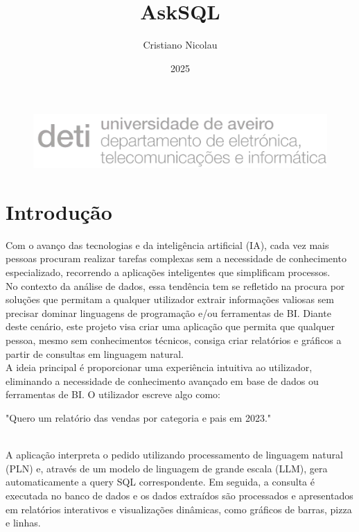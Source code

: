 \documentclass{article}
\title{AskSQL}
\author{Cristiano Nicolau}
\date{2025}
\begin{document}
\begin{figure}
    \centering
    \includegraphics[width=0.75\linewidth]{images/deti.png}
    \label{fig:enter-label}
\end{figure}
\maketitle


\clearpage


\tableofcontents
\clearpage

\section{Introdu\c{c}\~ao}


\hspace*{1em} Com o avanço das tecnologias e da inteligência artificial (IA), cada vez mais pessoas procuram realizar tarefas complexas sem a necessidade de conhecimento especializado, recorrendo a aplicações inteligentes que simplificam processos. \\
\hspace*{1em} No contexto da análise de dados, essa tendência tem se refletido na procura por soluções que permitam a qualquer utilizador extrair informações valiosas sem precisar dominar linguagens de programação e/ou ferramentas de BI.
Diante deste cenário, este projeto visa criar uma aplicação que permita que qualquer pessoa, mesmo sem conhecimentos técnicos, consiga criar relatórios e gráficos a partir de consultas em linguagem natural.\\
\hspace*{1em} A ideia principal é proporcionar uma experiência intuitiva ao utilizador, eliminando a necessidade de conhecimento avançado em base de dados ou ferramentas de BI. O utilizador escreve algo como:

\begin{center} "Quero um relatório das vendas por categoria e pais em 2023." \end{center}
\\

A aplicação interpreta o pedido utilizando processamento de linguagem natural (PLN) e, através de um modelo de linguagem de grande escala (LLM), gera automaticamente a query SQL correspondente. Em seguida, a consulta é executada no banco de dados e os dados extraídos são processados e apresentados em relatórios interativos e visualizações dinâmicas, como gráficos de barras, pizza e linhas.
\end{document}

